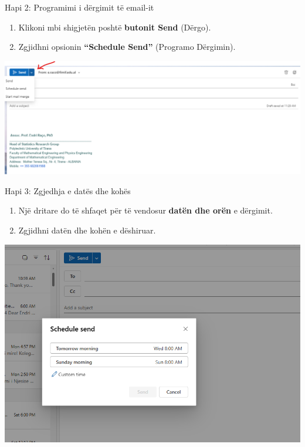 \documentclass[
  ignorenonframetext,
]{beamer}
\begin{document}
\begin{frame}{Hapi 2: Programimi i dërgimit të email-it}
\label{hapi-2-programimi-i-duxebrgimit-tuxeb-email-it}
\begin{enumerate}
\item
  Klikoni mbi shigjetën poshtë \textbf{butonit Send} (Dërgo).
\item
  Zgjidhni opsionin \textbf{``Schedule Send''} (Programo Dërgimin).
\end{enumerate}

\includegraphics{./images/outlook32.png}
\end{frame}

\begin{frame}{Hapi 3: Zgjedhja e datës dhe kohës}
\label{hapi-3-zgjedhja-e-datuxebs-dhe-kohuxebs}
\begin{enumerate}
\item
  Një dritare do të shfaqet për të vendosur \textbf{datën dhe orën} e
  dërgimit.
\item
  Zgjidhni datën dhe kohën e dëshiruar.
\end{enumerate}

\includegraphics{./images/outlook33.png}
\end{frame}
\end{document}
